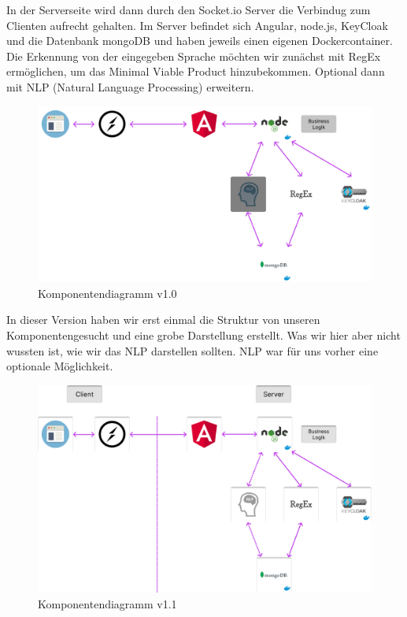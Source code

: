 \noindent In der Serverseite wird dann durch den Socket.io Server die Verbindug zum Clienten aufrecht gehalten.
Im Server befindet sich Angular, node.js, KeyCloak und die Datenbank mongoDB und haben jeweils einen eigenen Dockercontainer. 
Die Erkennung von der eingegeben Sprache möchten wir zunächst mit RegEx ermöglichen, 
um das Minimal Viable Product hinzubekommen. Optional dann mit NLP (Natural Language Processing) erweitern.

\begin{figure}[!hbt]
    \centering
    \includegraphics[width=1.0\textwidth]{bilder/technologien/Komponenten-Diagram-v1.png}
    \caption{Komponentendiagramm v1.0}
    \label{fig:Komponentendiagramm_v1.0}
    \end{figure}

\noindent In dieser Version haben wir erst einmal die Struktur von unseren Komponentengesucht und eine
grobe Darstellung erstellt. Was wir hier aber nicht wussten ist, wie wir das NLP darstellen sollten.
NLP war für uns vorher eine optionale Möglichkeit.

    \begin{figure}[!hbt]
        \centering
        \includegraphics[width=1.0\textwidth]{bilder/technologien/Komponentendiagram v1.1.png}
        \caption{Komponentendiagramm v1.1}
        \label{fig:Komponentendiagramm_v1.1}
        \end{figure}
        \FloatBarrier 

